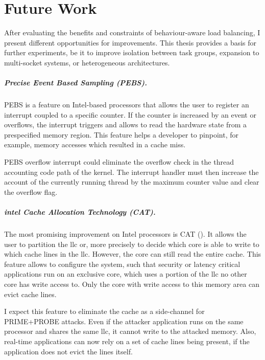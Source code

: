 \chapter{Future Work}
\label{sec:futurework}


After evaluating the benefits and constraints of behaviour-aware load
balancing, I present different opportunities for improvements.
This thesis provides a basis for further experiments, be it to improve
isolation between task groups, expansion to multi-socket systems, or
heterogeneous architectures.

\paragraph{Precise Event Based Sampling (PEBS).}
PEBS is a feature on Intel-based processors that allows the user to register
an interrupt coupled to a specific counter.
If the counter is increased by an event or overflows, the interrupt triggers
and allows to read the hardware state from a prespecified memory region.
This feature helps a developer to pinpoint, for example, memory accesses which
resulted in a cache miss.

PEBS overflow interrupt could eliminate the overflow check in the thread
accounting code path of the kernel.
The interrupt handler must then increase the account of the currently running
thread by the maximum counter value and clear the overflow flag.

\paragraph{\gls{intel} Cache Allocation Technology (CAT).}
The most promising improvement on Intel processors is CAT (\cite{intel_cat}).
It allows the user to partition the \gls{llc} or, more precisely to decide
which core is able to write to which cache lines in the \gls{llc}.
However, the core can still read the entire cache.
This feature allows to configure the system, such that security or latency
critical applications run on an exclusive core, which uses a portion of the
\gls{llc} no other core has write access to.
Only the core with write access to this memory area can evict cache lines.

I expect this feature to eliminate the cache as a side-channel for PRIME+PROBE
attacks.
Even if the attacker application runs on the same processor and shares the same
\gls{llc}, it cannot write to the attacked memory.
Also, real-time applications can now rely on a set of cache lines being
present, if the application does not evict the lines itself.

